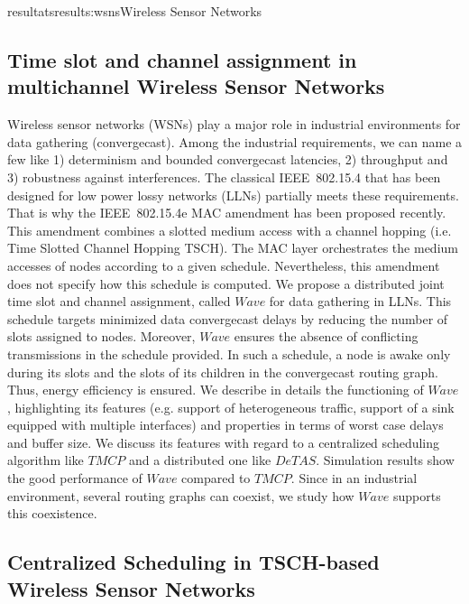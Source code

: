 \documentclass{ra2016}
\begin{document}
\begin{module}{resultats}{results:wsns}{Wireless Sensor Networks}
\subsection{Time slot and channel assignment in multichannel Wireless Sensor Networks}

\begin{participants}
\end{participants}

Wireless sensor networks (WSNs) play a major role in industrial environments for data gathering (convergecast). 
Among the industrial requirements, we can name a few like 1) determinism and bounded convergecast latencies, 2) throughput and 3) robustness against interferences.
The classical IEEE~802.15.4 that has been designed for low power lossy networks (LLNs) partially meets these requirements. That is why the IEEE~802.15.4e MAC amendment
has been proposed recently. This amendment combines a slotted medium access with a channel hopping (i.e. Time Slotted Channel Hopping TSCH). The MAC layer orchestrates the medium accesses of nodes according to a given schedule. Nevertheless, this amendment does not specify how this schedule is computed. We propose a distributed joint time slot and channel assignment, called $Wave$ for data gathering in LLNs. This schedule targets minimized data convergecast delays by reducing the number of slots assigned to nodes. Moreover, $Wave$ ensures the absence of conflicting transmissions in the schedule provided. In such a schedule, a node is awake only during its slots and the slots of its children in the convergecast routing graph. Thus, energy efficiency is ensured. We describe in details the functioning of $Wave$, highlighting its features (e.g. support of heterogeneous traffic, support of a sink equipped with multiple interfaces) and properties in terms of worst case delays and buffer size. We discuss 
its features with regard to a centralized scheduling algorithm like $TMCP$ and a distributed one like $DeTAS$. Simulation results show the good performance of $Wave$ compared to $TMCP$. Since in an industrial environment, several routing graphs can coexist, we study how $Wave$ supports this coexistence.



\subsection{Centralized Scheduling in TSCH-based Wireless Sensor Networks}


\end{module}
\end{document}
